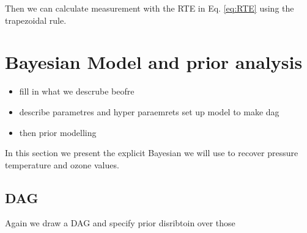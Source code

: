 Then we can calculate measurement with the RTE in Eq. \ref{eq:RTE} using the trapezoidal rule.



\section{Bayesian Model and prior analysis}
\begin{itemize}
	\item fill in what we descrube beofre 
	\item describe parametres and hyper paraemrets set up model to make dag
	\item then prior modelling
\end{itemize}
In this section we present the explicit Bayesian we will use to recover pressure temperature and ozone values.

\subsection{DAG}
Again we draw a DAG and specify prior disribtoin over those

